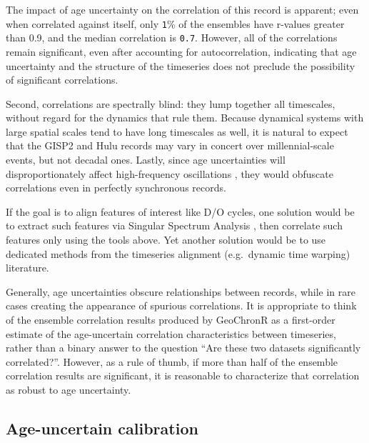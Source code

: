 \documentclass[gchron, manuscript]{copernicus}
\begin{document}
The impact of age uncertainty on the correlation of this record is apparent; even when correlated against itself, only \texttt{1}\% of the ensembles have r-values greater than 0.9, and the median correlation is \texttt{0.7}.
However, all of the correlations remain significant, even after accounting for autocorrelation, indicating that age uncertainty and the structure of the timeseries does not preclude the possibility of significant correlations.

Second, correlations are spectrally blind: they lump together all timescales, without regard for the dynamics that rule them. Because dynamical systems with large spatial scales tend to have long timescales as well, it is natural to expect that the GISP2 and Hulu records may vary in concert over millennial-scale events, but not decadal ones. Lastly, since age uncertainties will disproportionately affect high-frequency oscillations \citep[e.g.][]{BAM}, they would obfuscate correlations even in perfectly synchronous records.

If the goal is to align features of interest like D/O cycles, one solution would be to extract such features via Singular Spectrum Analysis \citep{Vautard1992, Vautard89}, then correlate such features only using the tools above. Yet another solution would be to use dedicated methods from the timeseries alignment (e.g.~dynamic time warping) literature.

Generally, age uncertainties obscure relationships between records, while in rare cases creating the appearance of spurious correlations. It is appropriate to think of the ensemble correlation results produced by GeoChronR as a first-order estimate of the age-uncertain correlation characteristics between timeseries, rather than a binary answer to the question ``Are these two datasets significantly correlated?''.
However, as a rule of thumb, if more than half of the ensemble correlation results are significant, it is reasonable to characterize that correlation as robust to age uncertainty.

\subsection{Age-uncertain calibration}
\end{document}
